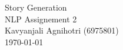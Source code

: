 \documentclass{article}
\begin{document}
    \begingroup  
        \centering
        \LARGE Story Generation\\
        \LARGE NLP Assignement 2\\[0.5em]
        \large{Kavyanjali Agnihotri (6975801)}\\
        \large \today\\[0.5em]
    \endgroup
\end{document}
